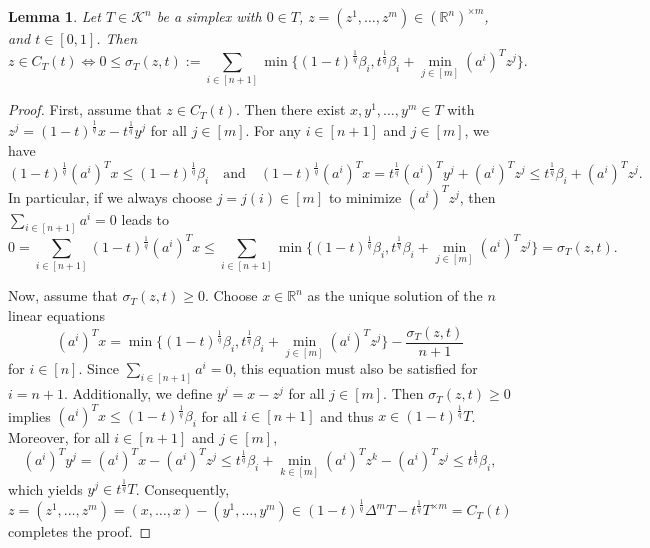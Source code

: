 \documentclass{amsart}
\newtheorem{lemma}[theorem]{Lemma}
\newcommand\R{\mathbb{R}}
\newcommand\CK{\mathcal{K}}
\newcommand{\diag}[2]{\Delta^{#1} #2}
\newcommand{\lyz}[4]{C_{#3} (#4)}
\newcommand{\sumfunc}[5]{\sigma_{#3}(#4,#5)}
\newcommand{\cartesian}[2]{#1^{\times #2}}
\begin{document}
\begin{lemma}\label{lem:simplex_lyz}
Let $T \in \CK^n$ be a simplex with $0 \in T$,
$z = (z^1, \dots, z^m) \in \cartesian{(\R^n)}{m}$,
and $t \in [0,1]$.
Then
\[
	z \in \lyz{p}{m}{T}{t}
	\iff 0 \leq \sumfunc{p}{m}{T}{z}{t}
	:= \sum_{i \in [n+1]} \min \bigg\{ (1-t)^{\frac{1}{q}} \beta_i, t^{\frac{1}{q}} \beta_i + \min_{j \in [m]} (a^i)^T z^j \bigg\}.
\]
\end{lemma}
\begin{proof}
First, assume that $z \in \lyz{p}{m}{T}{t}$.
Then there exist $x, y^1, \dots, y^m \in T$ with $z^j = (1-t)^{\frac{1}{q}} x - t^{\frac{1}{q}} y^j$ for all $j \in [m]$.
For any $i \in [n+1]$ and $j \in [m]$, we have
\[
	(1-t)^{\frac{1}{q}} (a^i)^T x \leq (1-t)^{\frac{1}{q}} \beta_i
		\quad \text{and} \quad
	(1-t)^{\frac{1}{q}} (a^i)^T x = t^{\frac{1}{q}} (a^i)^T y^j + (a^i)^T z^j \leq t^{\frac{1}{q}} \beta_i + (a^i)^T z^j.
\]
In particular, if we always choose $j = j(i) \in [m]$ to minimize $(a^i)^T z^j$,
then $\sum_{i \in [n+1]} a^i = 0$ leads to
\[
	0
	= \sum_{i \in [n+1]} (1-t)^{\frac{1}{q}} (a^i)^T x
	\leq \sum_{i \in [n+1]} \min \bigg\{ (1-t)^{\frac{1}{q}} \beta_i, t^{\frac{1}{q}} \beta_i + \min_{j \in [m]} (a^i)^T z^j \bigg\}
	= \sumfunc{p}{m}{T}{z}{t}.
\]

Now, assume that $\sumfunc{p}{m}{T}{z}{t} \geq 0$.
Choose $x \in \R^n$ as the unique solution of the $n$ linear equations
\[
	(a^i)^T x
	= \min \bigg\{ (1-t)^{\frac{1}{q}} \beta_i, t^{\frac{1}{q}} \beta_i + \min_{j \in [m]} (a^i)^T z^j \bigg\} - \frac{\sumfunc{p}{m}{T}{z}{t}}{n+1}
\]
for $i \in [n]$.
Since $\sum_{i \in [n+1]} a^i = 0$, this equation must also be satisfied for $i = n+1$.
Additionally, we define $y^j = x - z^j$ for all $j \in [m]$.
Then $\sumfunc{p}{m}{T}{z}{t} \geq 0$ implies $(a^i)^T x \leq (1-t)^{\frac{1}{q}} \beta_i$ for all $i \in [n+1]$ and thus $x \in (1-t)^{\frac{1}{q}} T$.
Moreover, for all $i \in [n+1]$ and $j \in [m]$,
\[
	(a^i)^T y^j
	= (a^i)^T x - (a^i)^T z^j
	\leq t^{\frac{1}{q}} \beta_i + \min_{k \in [m]} (a^i)^T z^k - (a^i)^T z^j
	\leq t^{\frac{1}{q}} \beta_i,
\]
which yields $y^j \in t^{\frac{1}{q}} T$.
Consequently,
\[
	z
	= (z^1, \dots, z^m)
	= (x, \dots, x) - (y^1, \dots, y^m)
	\in (1-t)^{\frac{1}{q}} \diag{m} T - t^{\frac{1}{q}} \cartesian{T}{m}
	= \lyz{p}{m}{T}{t}
\]
completes the proof.
\end{proof}
\end{document}
